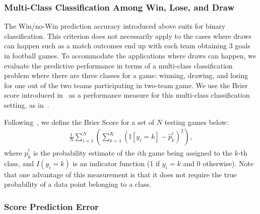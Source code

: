 \subsubsection{Multi-Class Classification Among Win, Lose, and Draw}
\label{sec:multiclassClassification}
The Win/no-Win prediction accuracy introduced above suits for binary classification. This criterion does not necessarily apply to the cases where draws can happen such as a match outcomes end up with each team obtaining 3 goals in football games. To accommodate the applications where draws can happen, we evaluate the predictive performance in terms of a multi-class classification problem where there are three classes for a game: winning, drawing, and losing for one out of the two teams participating in two-team game. We use the Brier score introduced in~\cite{Brier:BrierScore} as a performance measure for this multi-class classification setting, as in~\cite{huang06GeneralizedBradleyTerryModels}. 

Following~\cite{huang06GeneralizedBradleyTerryModels}, we define the Brier Score for a set of $N$ testing games below:
\begin{align}
	\frac{1}{N}\sum_{i=1}^{N}\left( \sum_{k=1}^{K} \left(\mathbb{I}[y_i = k] - \hat{p}_{k}^{i}\right)^2  \right),
\end{align}
where $\hat{p}_{k}^{i}$ is the probability estimate of the $i$th game being assigned to the $k$-th class, and $I(y_i = k)$ is an indicator function (1 if $y_i=k$ and 0 otherwise). Note that one advantage of this measurement is that it does not require the true probability of a data point belonging to a class. 

\subsubsection{Score Prediction Error}
\label{sec:scorePredictionError}





